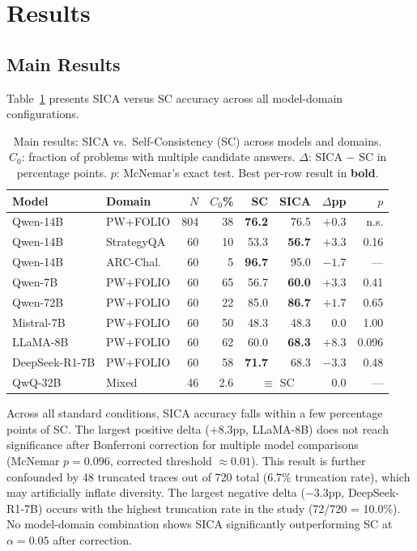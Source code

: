 \documentclass[11pt]{article}
\begin{document}
\section{Results}
\label{sec:results}

\subsection{Main Results}
\label{sec:main}

Table~\ref{tab:main} presents SICA versus SC accuracy across all model-domain configurations.

\begin{table}[t]
\centering
\caption{Main results: SICA vs.\ Self-Consistency (SC) across models and domains. $C_0$: fraction of problems with multiple candidate answers. $\Delta$: SICA $-$ SC in percentage points. $p$: McNemar's exact test. Best per-row result in \textbf{bold}.}
\label{tab:main}
\small
\begin{tabular}{@{}llrrrrrr@{}}
\toprule
Model & Domain & $N$ & $C_0$\% & SC & SICA & $\Delta$pp & $p$ \\
\midrule
Qwen-14B & PW+FOLIO & 804 & 38 & \textbf{76.2} & 76.5 & $+0.3$ & n.s. \\
Qwen-14B & StrategyQA & 60 & 10 & 53.3 & \textbf{56.7} & $+3.3$ & 0.16 \\
Qwen-14B & ARC-Chal. & 60 & 5 & \textbf{96.7} & 95.0 & $-1.7$ & --- \\
\midrule
Qwen-7B & PW+FOLIO & 60 & 65 & 56.7 & \textbf{60.0} & $+3.3$ & 0.41 \\
Qwen-72B & PW+FOLIO & 60 & 22 & 85.0 & \textbf{86.7} & $+1.7$ & 0.65 \\
\midrule
Mistral-7B & PW+FOLIO & 60 & 50 & 48.3 & 48.3 & $0.0$ & 1.00 \\
LLaMA-8B & PW+FOLIO & 60 & 62 & 60.0 & \textbf{68.3} & $+8.3$ & 0.096 \\
DeepSeek-R1-7B & PW+FOLIO & 60 & 58 & \textbf{71.7} & 68.3 & $-3.3$ & 0.48 \\
\midrule
QwQ-32B & Mixed & 46 & 2.6 & \multicolumn{2}{c}{$\equiv$ SC} & $0.0$ & --- \\
\bottomrule
\end{tabular}
\end{table}

Across all standard conditions, SICA accuracy falls within a few percentage points of SC.
The largest positive delta ($+8.3$pp, LLaMA-8B) does not reach significance after Bonferroni correction for multiple model comparisons (McNemar $p{=}0.096$, corrected threshold $\approx 0.01$).
This result is further confounded by 48 truncated traces out of 720 total (6.7\% truncation rate), which may artificially inflate diversity.
The largest negative delta ($-3.3$pp, DeepSeek-R1-7B) occurs with the highest truncation rate in the study (72/720 = 10.0\%).
No model-domain combination shows SICA significantly outperforming SC at $\alpha{=}0.05$ after correction.
\end{document}
